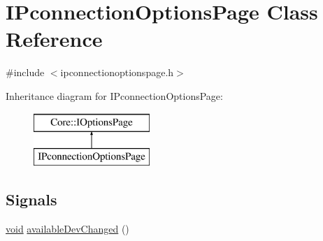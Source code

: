 \hypertarget{class_i_pconnection_options_page}{\section{\-I\-Pconnection\-Options\-Page \-Class \-Reference}
\label{class_i_pconnection_options_page}
}


{\ttfamily \#include $<$ipconnectionoptionspage.\-h$>$}

\-Inheritance diagram for \-I\-Pconnection\-Options\-Page\-:\begin{figure}[H]
\begin{center}
\leavevmode
\includegraphics[height=2.000000cm]{class_i_pconnection_options_page}
\end{center}
\end{figure}
\subsection*{\-Signals}
\begin{DoxyCompactItemize}
\item 
\hyperlink{group___u_a_v_objects_plugin_ga444cf2ff3f0ecbe028adce838d373f5c}{void} \hyperlink{group___i_p_conn_plugin_ga1fa25251ff83374c3d8c41d161406b3a}{available\-Dev\-Changed} ()
\end{DoxyCompactItemize}
